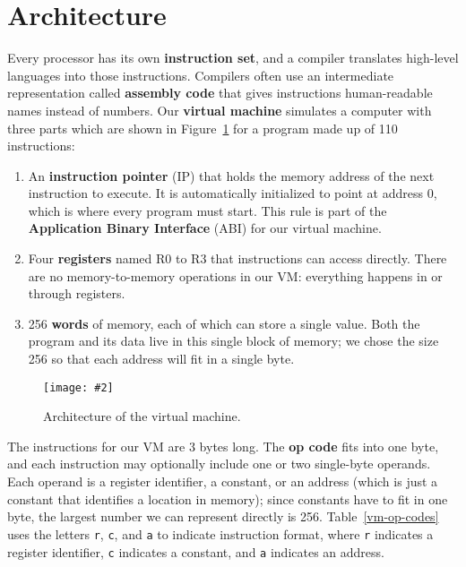 \documentclass{scrbook}
\newcommand{\figref}[1]{Figure~\ref{#1}}
\newcommand{\tblref}[1]{Table~\ref{#1}}
\newcommand{\figpdf}[4]{\begin{figure}%
\centering%
\texttt{[image: \#2]}%
\caption{#3}%
\label{#1}%
\end{figure}}
\newcommand{\glossref}[1]{\textbf{#1}}
\begin{document}
\section{Architecture}\label{vm-arch}


Every processor has its own \glossref{instruction set},
and a compiler translates high-level languages into those instructions.
Compilers often use an intermediate representation called
\glossref{assembly code}
that gives instructions human-readable names instead of numbers.
Our \glossref{virtual machine} simulates
a computer with three parts
which are shown in \figref{vm-architecture}
for a program made up of 110 instructions:

\begin{enumerate}

\item 

An \glossref{instruction pointer} (IP)
    that holds the memory address of the next instruction to execute.
    It is automatically initialized to point at address 0,
    which is where every program must start.
    This rule is part of the \glossref{Application Binary Interface} (ABI)
    for our virtual machine.



\item 

Four \glossref{registers} named R0 to R3 that instructions can access directly.
    There are no memory-to-memory operations in our VM:
    everything  happens in or through registers.



\item 

256 \glossref{words} of memory, each of which can store a single value.
    Both the program and its data live in this single block of memory;
    we chose the size 256 so that each address will fit in a single byte.



\end{enumerate}

\figpdf{vm-architecture}{./vm/architecture.pdf}{Architecture of the virtual machine.}{0.6}


The instructions for our VM are 3 bytes long.
The \glossref{op code} fits into one byte,
and each instruction may optionally include one or two single-byte operands.
Each operand is a register identifier,
a constant,
or an address
(which is just a constant that identifies a location in memory);
since constants have to fit in one byte,
the largest number we can represent directly is 256.
\tblref{vm-op-codes} uses the letters \texttt{r}, \texttt{c}, and \texttt{a}
to indicate instruction format,
where \texttt{r} indicates a register identifier,
\texttt{c} indicates a constant,
and \texttt{a} indicates an address.
\end{document}
